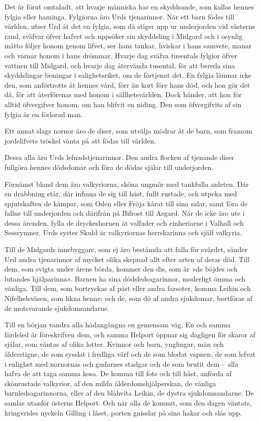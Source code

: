 Det är förut omtaladt, att hvarje människa har en skyddsande, som kallas
hennes fylgia eller haminga. Fylgiorna äro Urds tjenarinnor. När ett
barn födes till världen, utser Urd åt det en fylgia, som då stiger upp
ur underjorden vid västerns rand, sväfvar öfver hafvet och uppsöker sin
skyddsling i Midgard och i osynlig måtto följer honom genom
lifvet, ser hans tankar, hviskar i hans samvete, manar och varnar honom
i hans drömmar. Hvarje dag sväfva tusentals fylgior öfver vattnen till
Midgard, och hvarje dag återvända tusental, för att bereda sina
skyddslingar boningar i salighetsriket, om de förtjenat det. En fylgia
lämnar icke den, som anförtrotts åt hennes vård, förr än kort före hans
död, och hon gör det då, för att återförenas med honom i
sällhetsvärlden. Dock händer, att hon för alltid öfvergifver honom, om
han blifvit en niding. Den som öfvergifvits af sin fylgia är en förlorad
man.

Ett annat slags nornor äro de diser, som utvälja mödrar åt de barn, som
framom jordelifvets tröskel vänta på att födas till världen.

Dessa alla äro Urds lefnadstjenarinnor. Den andra flocken af tjenande
diser fullgöra hennes dödsdomar och föra de dödas själar till
underjorden.

Förnämst bland dem äro valkyriorna, sköna ungmör med tankfulla anleten.
Där en drabbning står, där infinna de sig till häst, fullt rustade, och
utpeka med spjutskaften de kämpar, som Oden eller Fröja kårat till sina
salar, samt föra de fallne till underjorden och därifrån på Bifrost till
Asgard. När de icke äro ute i dessa ärenden, fylla de dryckeshornen åt
valfader och einheriarne i Valhall och Sessrymner. Urds syster Skuld är
valkyriornas herrskarinna och själf valkyria.

Till de Midgards innebyggare, som ej äro bestämda att falla för svärdet,
sänder Urd andra tjenarinnor af mycket olika skepnad allt efter arten af
deras död. Till dem, som svigta under årens börda, kommer den dis, som
är »de böjdes och lutandes hjälparinna». Barnen ha sina
dödsledsagarinnor, moderligt ömma och vänliga. Till dem, som bortryckas
af päst eller andra farsoter, komma Leikin och Nifelhelsväsen, som likna
henne; och de, som dö af andra sjukdomar, bortföras af de motsvarande
sjukdomsandarne.

Till en början vandra alla hädangångna en gemensam väg. En och samma
färdeled är föreskrifven dem, och samma Helport öppnar sig dagligen för
skaror af själar, som väntas
af olika lotter. Kvinnor och barn, ynglingar, män och ålderstigne, de
som sysslat i fredliga värf och de som blodat vapnen, de som lefvat i
enlighet med nornornas och gudarnes stadgar och de som brutit dem --
alla hafva de att taga samma kosa. De komma till fots och till häst,
anförda af skönrustade valkyrior, af den milda ålderdomshjälperskan, de
vänliga barnledsagarinnorna, eller af den blåhvita Leikin, de dystra
sjukdomsandarne. De samlas utanför österns Helport. Och när alla de
kommit, som den dagen väntats, kringvrides nyckeln Gilling i låset,
porten gnisslar på sina hakar och slås upp.

